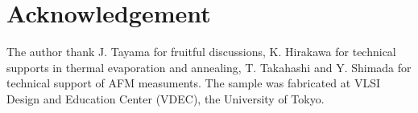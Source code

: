 \documentclass[twocolumn,10.5pt,a4]{article}
\begin{document}
\section*{Acknowledgement}
The author thank J. Tayama for fruitful discussions, K. Hirakawa for technical supports in thermal evaporation and annealing, T. Takahashi and Y. Shimada for  technical support of AFM measuments.
The sample was fabricated at VLSI Design and Education Center (VDEC), the University of Tokyo.




\newpage
\end{document}
